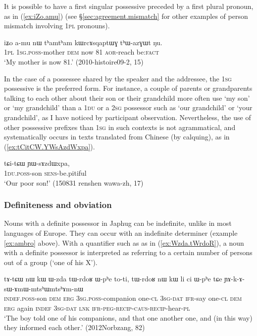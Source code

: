 It is possible to have a first singular possessive preceded by a first plural pronoun, as in (\ref{ex:iZo.amu}) (see §\ref{sec:agreement.mismatch} for other examples of person mismatch involving \textsc{1pl} pronouns).

\begin{exe}
\ex \label{ex:iZo.amu}
\gll iʑo a-mu nɯ tʰamtʰam kɯrcɤsqaptɯɣ tʰɯ-azɣɯt ŋu. \\
\textsc{1pl} \textsc{1sg}.\textsc{poss}-mother \textsc{dem} now 81 \textsc{aor}-reach  be:\textsc{fact} \\
\glt `My mother is now 81.' (2010-histoire09-2, 15)
\end{exe}

In the case of a possessee shared by the speaker and the addressee, the \textsc{1sg} possessive is the preferred form. For instance, a couple of parents or grandparents talking to each other about their son or their grandchild more often use  `my son' or  `my grandchild' than a \textsc{1du} or a \textsc{2sg} possessor such as  `our grandchild' or  `your grandchild', as I have noticed by participant observation. Nevertheless, the use of other possessive prefixes than \textsc{1sg} in such contexts is not agrammatical, and systematically occurs in texts translated from Chinese (by calquing), as in (\ref{ex:tCitCW.YWsAzdWxpa}). 

\begin{exe}
\ex \label{ex:tCitCW.YWsAzdWxpa}
\gll tɕi-tɕɯ ɲɯ-sɤzdɯxpa,  \\
\textsc{1du}.\textsc{poss}-son \textsc{sens}-be.pitiful \\
\glt `Our poor son!' (150831 renshen wawa-zh, 17)
\end{exe}

 

\subsubsection{Definiteness and obviation} \label{sec:possessive.prefix.obv.def}
Nouns with a definite possessor in Japhug can be indefinite, unlike in most languages of Europe. They can occur with an indefinite determiner (example \ref{ex:ambro}  above). With a quantifier such as  as in (\ref{ex:Wzda.tWrdoR}), a noun with a definite possessor is interpreted as referring to a certain number of persons out of a group (`one of his X').

 \begin{exe}
\ex \label{ex:Wzda.tWrdoR}
\gll tɤ-tɕɯ nɯ kɯ ɯ-zda tɯ-rdoʁ ɯ-pʰe to-ti, tɯ-rdoʁ nɯ kɯ li ci ɯ-pʰe tɕe ɲɤ-k-ɤ-sɯ-ɤmɯ-mtsʰɯ\redp{}mtsʰɤm-nɯ \\
\textsc{indef}.\textsc{poss}-son \textsc{dem} \textsc{erg} \textsc{3sg}.\textsc{poss}-companion one-\textsc{cl} \textsc{3sg}-\textsc{dat} \textsc{ifr}-say one-\textsc{cl}  \textsc{dem} \textsc{erg} again \textsc{indef} \textsc{3sg}-\textsc{dat} \textsc{lnk}   \textsc{ifr}-\textsc{peg}-\textsc{recip}-\textsc{caus}-\textsc{recip}-hear-\textsc{pl} \\
\glt `The boy told one of his companions, and that one another one, and (in this way) they informed each other.' (2012Norbzang, 82)
\end{exe}

